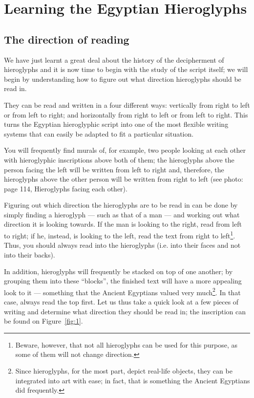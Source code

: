 \documentclass[a5paper,twoside,11pt]{report}
\begin{document}
\part*{Learning the Egyptian Hieroglyphs}
  \newpage

\chapter*{The direction of reading}

		We have just learnt a great deal about the history of the decipherment of hieroglyphs and it is now time to begin with the study of the script itself; we will begin by understanding how to figure out what direction hieroglyphs should be read in. 

		They can be read and written in a four different ways: vertically from right to left or from left to right; and horizontally from right to left or from left to right. This turns the Egyptian hieroglyphic script into one of the most flexible writing systems that can easily be adapted to fit a particular situation. 

		You will frequently find murals of, for example, two people looking at each other with hieroglyphic inscriptions above both of them; the hieroglyphs above the person facing the left will be written from left to right and, therefore, the hieroglyphs above the other person will be written from right to left (see photo: page 114, Hieroglyphs facing each other).

		Figuring out which direction the hieroglyphs are to be read in can be done by simply finding a hieroglyph — such as that of a man — and working out what direction it is looking towards. If the man is looking to the right, read from left to right; if he, instead, is looking to the left, read the text from right to left\footnote{Beware, however, that not all hieroglyphs can be used for this purpose, as some of them will not change direction.}. Thus, you should always read into the hieroglyphs (i.e. into their faces and not into their backs). 

		In addition, hieroglyphs will frequently be stacked on top of one another; by grouping them into these “blocks”, the finished text will have a more appealing look to it — something that the Ancient Egyptians valued very much\footnote{Since hieroglyphs, for the most part, depict real-life objects, they can be integrated into art with ease; in fact, that is something the Ancient Egyptians did frequently.}. In that case, always read the top first. 
		Let us thus take a quick look at a few pieces of writing and determine what direction they should be read in; the inscription can be found on Figure~\ref{fig:1}.
\end{document}
